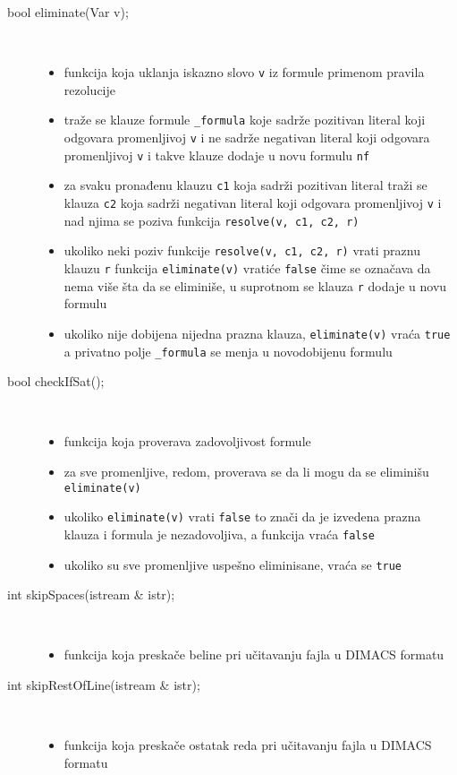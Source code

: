 \documentclass[a4paper, 12pt]{article}
\begin{document}
\begin{description}
	\item[bool eliminate(Var v);] ~
	\begin{itemize}
		\item funkcija koja uklanja iskazno slovo \verb|v| iz formule primenom pravila rezolucije
		\item traže se klauze formule \verb|_formula| koje sadrže pozitivan literal koji odgovara promenljivoj \verb|v| i ne sadrže negativan literal koji odgovara promenljivoj \verb|v| i takve klauze dodaje u novu formulu  \verb|nf|
		\item za svaku pronađenu klauzu  \verb|c1| koja sadrži pozitivan literal traži se klauza  \verb|c2| koja sadrži negativan literal koji odgovara promenljivoj  \verb|v| i nad njima se poziva funkcija  \verb|resolve(v, c1, c2, r)|
		\item ukoliko neki poziv funkcije  \verb|resolve(v, c1, c2, r)| vrati  praznu klauzu \verb|r| funkcija  \verb|eliminate(v)| vratiće \verb|false| čime se označava da nema više šta da se eliminiše, u suprotnom se klauza  \verb|r| dodaje u novu formulu
		\item ukoliko nije dobijena nijedna prazna klauza,  \verb|eliminate(v)| vraća \verb|true| a privatno polje \verb|_formula| se menja u novodobijenu formulu
	\end{itemize}

	\item[bool checkIfSat();] ~
	\begin{itemize}
		\item funkcija koja proverava zadovoljivost formule
		\item za sve promenljive, redom, proverava se da li mogu da se eliminišu \verb|eliminate(v)|
		\item ukoliko  \verb|eliminate(v)| vrati  \verb|false| to znači da je izvedena prazna klauza i formula je nezadovoljiva, a funkcija vraća \verb|false|
		\item ukoliko su sve promenljive uspešno eliminisane, vraća se \verb|true|
	\end{itemize}

	\item[int skipSpaces(istream \& istr);] ~
	\begin{itemize}
		\item funkcija koja preskače beline pri učitavanju fajla u DIMACS formatu
	\end{itemize}

	\item[int skipRestOfLine(istream \& istr);] ~
	\begin{itemize}
		\item funkcija koja preskače ostatak reda pri učitavanju fajla u DIMACS formatu
	\end{itemize}
	

\end{description}
\end{document}

